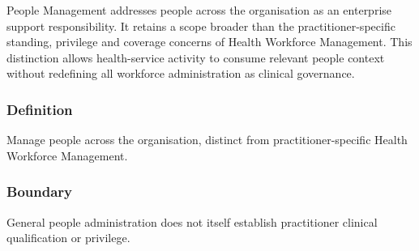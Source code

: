 People Management addresses people across the organisation as an enterprise support responsibility. It retains a scope broader than the practitioner-specific standing, privilege and coverage concerns of Health Workforce Management. This distinction allows health-service activity to consume relevant people context without redefining all workforce administration as clinical governance.

\subsubsection*{Definition}

Manage people across the organisation, distinct from practitioner-specific Health Workforce Management.

\subsubsection*{Boundary}

General people administration does not itself establish practitioner clinical qualification or privilege.

